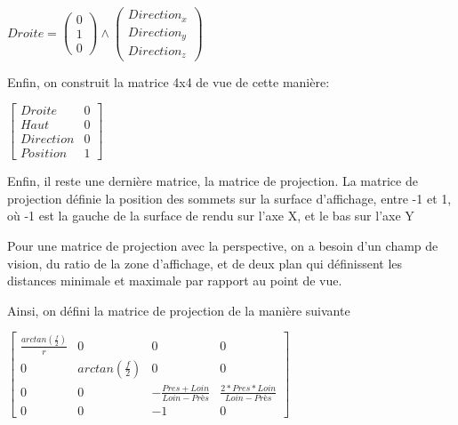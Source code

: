 \documentclass[pdftex, 11pt, a4paper, titlepage]{article}
\begin{document}
\begin{math}
  Droite =
  \begin{pmatrix}
    0 \\
    1 \\
    0
  \end{pmatrix}
  \wedge %
  \begin{pmatrix}
    Direction_x \\
    Direction_y \\
    Direction_z
  \end{pmatrix}
\end{math}

Enfin, on construit la matrice 4x4 de vue de cette manière:

\begin{math}
  \begin{bmatrix}
    Droite    & 0 \\
    Haut      & 0 \\
    Direction & 0 \\
    Position  & 1
  \end{bmatrix}
\end{math}

Enfin, il reste une dernière matrice, la matrice de projection.  La
matrice de projection définie la position des sommets sur la surface
d'affichage, entre -1 et 1, où -1 est la gauche de la surface de rendu
sur l'axe X, et le bas sur l'axe Y

Pour une matrice de projection avec la perspective, on a besoin d'un
champ de vision, du ratio de la zone d'affichage, et de deux plan qui
définissent les distances minimale et maximale par rapport au point de
vue.

Ainsi, on défini la matrice de projection de la manière suivante

\begin{math}
  \begin{bmatrix}
    \frac{arctan(\frac{f}{2})}{r} & 0                  & 0                                 & 0                                   \\
    0                             &arctan(\frac{f}{2}) & 0                                 & 0                                   \\
    0                             & 0                  & - \frac{Pres + Loin}{Loin - Près} & \frac{2 * Pres * Loin}{Loin - Près} \\
    0                             & 0                  & - 1                               & 0
  \end{bmatrix}
\end{math}
\end{document}
